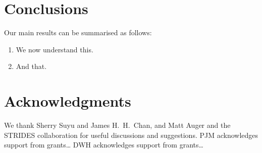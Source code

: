 \documentclass[useAMS,usenatbib]{mn2e}
\begin{document}



\section{Conclusions}
\label{sec:concl}

Our main results can be summarised as follows:

\begin{enumerate}

\item We now understand this.

\item And that.

\end{enumerate}



\section*{Acknowledgments}
 
We thank Sherry Suyu and James H.\ H.\ Chan, and Matt Auger and the STRIDES
collaboration for useful discussions and suggestions.
PJM acknowledges support from grants\ldots
DWH acknowledges support from grants\ldots











\label{lastpage}
\bsp
\end{document}
